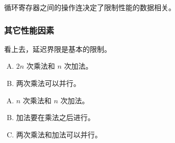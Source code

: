 {{{            循环寄存器之间的操作连决定了限制性能的数据相关。
        }

        \subsubsection{其它性能因素}
        {
            看上去，延迟界限是基本的限制。

            \begin{practicec}
                \begin{enumerate}[A.]
                    \item $2n$ 次乘法和 $n$ 次加法。
                    \item 两次乘法可以并行。
                \end{enumerate}
            \end{practicec}

            \begin{practicec}
                \begin{enumerate}[A.]
                    \item $n$ 次乘法和 $n$ 次加法。
                    \item 加法要在乘法之后进行。
                    \item 两次乘法和加法可以并行。
                \end{enumerate}
            \end{practicec}
        }
    }
}
